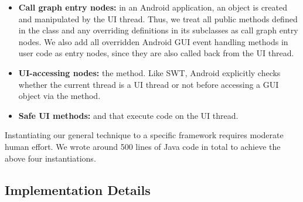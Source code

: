 

\begin{itemize}

\item \textbf{Call graph entry nodes: }in an Android application,
an  object is created and manipulated by the UI thread. Thus, we treat
all public methods defined in the  class 
and any overriding definitions in its subclasses as call graph entry nodes.
We also add all overridden Android GUI event handling methods in user
code as entry nodes, since they are also called back from the UI thread.

\smallstep

\item \textbf{UI-accessing nodes: }the  method.
Like SWT, Android explicitly checks whether
the current thread is a UI thread or not before accessing a GUI object via
the  method.

\smallstep

\item \textbf{Safe UI methods: } 
and  that execute code on the UI thread. 

\end{itemize}


Instantiating our general technique to  a specific framework
requires moderate human effort. We wrote around 500 lines of Java code in total to achieve
the above four instantiations.

\subsection{Implementation Details}

